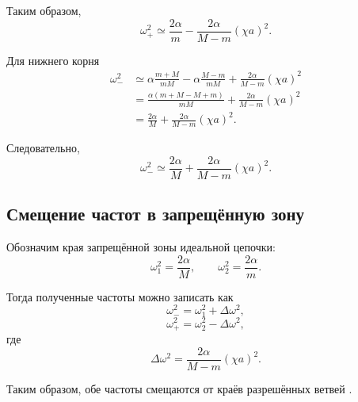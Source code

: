\documentclass[../final.tex]{subfiles}
\begin{document}
Таким образом,
%
\begin{equation*}
    \omega_+^2
    \simeq
    \frac{2\alpha}{m}
    -
    \frac{2\alpha}{M-m}
    (\chi a)^2.
\end{equation*}
%

Для нижнего корня
%
\begin{align*}
    \omega_-^2
    &\simeq
    \alpha
    \frac{m+M}{mM}
    -
    \alpha
    \frac{M-m}{mM}
    +
    \frac{2\alpha}{M-m}
    (\chi a)^2
    \\
    &=
    \frac{
        \alpha(m+M-M+m)
    }{
        mM
    }
    +
    \frac{2\alpha}{M-m}
    (\chi a)^2
    \\
    &=
    \frac{2\alpha}{M}
    +
    \frac{2\alpha}{M-m}
    (\chi a)^2.
\end{align*}
%

Следовательно,
%
\begin{equation*}
    \omega_-^2
    \simeq
    \frac{2\alpha}{M}
    +
    \frac{2\alpha}{M-m}
    (\chi a)^2.
\end{equation*}



\subsection*{Смещение частот в запрещённую зону}

Обозначим края запрещённой зоны идеальной цепочки:
%
\begin{equation*}
    \omega_1^2
    =
    \frac{2\alpha}{M},
    \qquad
    \omega_2^2
    =
    \frac{2\alpha}{m}.
\end{equation*}
%

Тогда полученные частоты можно записать как
%
\begin{equation*}
    \omega_-^2
    =
    \omega_1^2
    +
    \Delta\omega^2,
\end{equation*}
%
\begin{equation*}
    \omega_+^2
    =
    \omega_2^2
    -
    \Delta\omega^2,
\end{equation*}
%
где
%
\begin{equation*}
    \Delta\omega^2
    =
    \frac{2\alpha}{M-m}
    (\chi a)^2.
\end{equation*}
%

Таким образом, обе частоты смещаются
от краёв разрешённых ветвей
.
\end{document}
